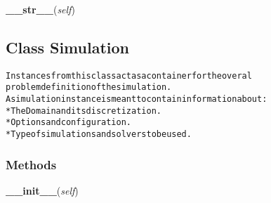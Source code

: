 \hspace{.8\funcindent}\begin{boxedminipage}{\funcwidth}

    \raggedright \textbf{\_\_str\_\_}(\textit{self})

\setlength{\parskip}{2ex}
\setlength{\parskip}{1ex}
    \end{boxedminipage}



\subsection{Class Simulation}

    \label{Classes:Simulation}
\begin{alltt}

Instances from this class act as a container for the overal 
problem definition of the simulation.
A simulation instance is meant to contain information about:
    * The Domain and its discretization.
    * Options and configuration.
    *Type of simulations and solvers to be used.
\end{alltt}



  \subsubsection{Methods}

    \label{Classes:Simulation:__init__}

    \vspace{0.5ex}

\hspace{.8\funcindent}\begin{boxedminipage}{\funcwidth}

    \raggedright \textbf{\_\_init\_\_}(\textit{self})

\setlength{\parskip}{2ex}
\setlength{\parskip}{1ex}
    \end{boxedminipage}

